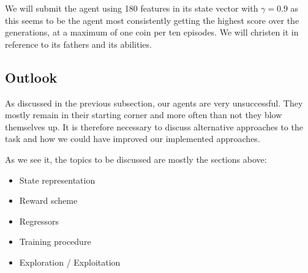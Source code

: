 We will submit the agent using 180 features in its state vector with $\gamma=0.9$ as this seems to be the agent most consistently getting the highest score over the generations, at a maximum of one coin per ten episodes. We will christen it  in reference to its fathers and its abilities.

\subsection{Outlook}
As discussed in the previous subsection, our agents are very unsuccessful. They mostly remain in their starting corner and more often than not they blow themselves up. It is therefore necessary to discuss alternative approaches to the task and how we could have improved our implemented approaches.\par


As we see it, the topics to be discussed are mostly the sections above:
\begin{itemize}
	\item State representation
	\item Reward scheme
	\item Regressors
	\item Training procedure
	\item Exploration / Exploitation
\end{itemize}

